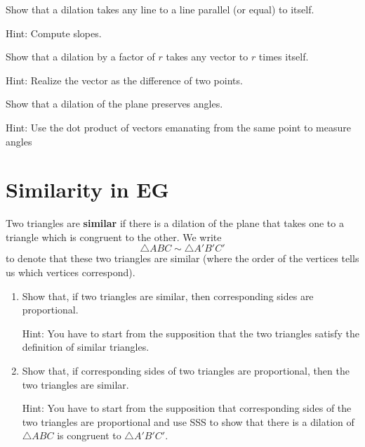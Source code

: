 \documentclass{ximera}
\begin{document}
\begin{question}
Show that a dilation takes any line to a line parallel (or
equal) to itself.

Hint: Compute slopes.
\end{question}

\begin{question}
Show that a dilation by a factor of $r$ takes any vector to $r$
times itself.

Hint: Realize the vector as the difference of two points.
\end{question}

\begin{question}
Show that a dilation of the plane preserves angles.

Hint: Use the dot product of vectors emanating from the same point to measure
angles
\end{question}



\section*{Similarity in \textbf{EG}}

\begin{definition}
Two triangles are \textbf{similar} if there is a dilation of the
plane that takes one to a triangle which is congruent to the other. We write%
\[
\triangle ABC\sim\triangle A'B'C'%
\]
to denote that these two triangles are similar (where the order of the
vertices tells us which vertices correspond).
\end{definition}

\begin{question}
\begin{enumerate}
\item Show that, if two triangles are similar, then corresponding
sides are proportional.

Hint: You have to start from the supposition that the two triangles satisfy
the definition of similar triangles.

\item Show that, if corresponding sides of two triangles are proportional, then
the two triangles are similar.

Hint: You have to start from the supposition that corresponding sides of the
two triangles are proportional and use SSS to show that there is a dilation of
$\triangle ABC$ is congruent to $\triangle A'B'C'$.
\end{enumerate}
\end{question}
\end{document}
